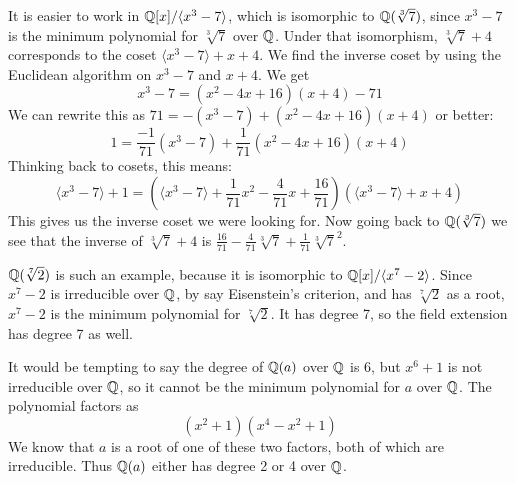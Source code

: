 \protect \documentclass [10pt]{exam}
\renewenvironment{Ans}[1]{\setcounter{question}{#1}\addtocounter{question}{-1}\question }{}
\begin{document}
\begin{questions}
\begin{Ans}{3}
\end{Ans}
\begin{Ans}{4}
It is easier to work in $\mathbb Q[x]/\langle x^3 - 7\rangle$, which is isomorphic to $\mathbb Q(\sqrt[3]{7})$, since $x^3 - 7$ is the minimum polynomial for $\sqrt[3]{7}$ over $\mathbb Q$.  Under that isomorphism, $\sqrt[3]{7} + 4$ corresponds to the coset $\langle x^3 - 7\rangle + x + 4$.  We find the inverse coset by using the Euclidean algorithm on $x^3 -7$ and $x+4$.  We get
\[x^3-7 = (x^2 - 4x + 16)(x+4) - 71\]
We can rewrite this as $71 = -(x^3 - 7) + (x^2 - 4x + 16)(x+4)$ or better:
\[1 = \frac{-1}{71}(x^3- 7) + \frac{1}{71}(x^2 - 4x + 16)(x+4)\]
Thinking back to cosets, this means:
\[\langle x^3 -7\rangle + 1 = (\langle x^3 - 7\rangle + \frac{1}{71}x^2 - \frac{4}{71}x + \frac{16}{71})(\langle x^3 - 7\rangle + x+4)\]
This gives us the inverse coset we were looking for.  Now going back to $\mathbb Q(\sqrt[3]{7})$ we see that the inverse of $\sqrt[3]{7} + 4$ is $\frac{16}{71} -\frac{4}{71}\sqrt[3]{7} + \frac{1}{71}\sqrt[3]{7}^2$.
\end{Ans}
\begin{Ans}{5}
 $\mathbb Q(\sqrt[7]{2})$ is such an example, because it is isomorphic to $\mathbb Q[x]/\langle x^7 - 2\rangle$.  Since $x^7 - 2$ is irreducible over $\mathbb Q$, by say Eisenstein's criterion, and has $\sqrt[7]{2}$ as a root, $x^7-2$ is the minimum polynomial for $\sqrt[7]{2}$.  It has degree 7, so the field extension has degree 7 as well.
\end{Ans}
\begin{Ans}{6}
It would be tempting to say the degree of $\mathbb Q(a)$ over $\mathbb Q$ is 6, but $x^6 + 1$ is not irreducible over $\mathbb Q$, so it cannot be the minimum polynomial for $a$ over $\mathbb Q$.  The polynomial factors as
\[(x^2 + 1)(x^4 - x^2 + 1)\]
We know that $a$ is a root of one of these two factors, both of which are irreducible.  Thus $\mathbb Q(a)$ either has degree 2 or 4 over $\mathbb Q$.
\end{Ans}
\begin{Ans}{7}
\end{Ans}
\end{questions}
\end{document}

